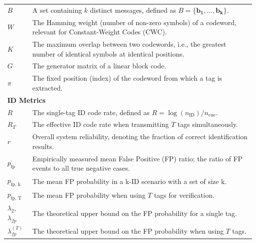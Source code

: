 \documentclass[english,BCOR=4mm,cdfont=false]{tudscrreprt} %
\begin{document}
\begin{longtable}{@{}p{} p{}@{}}
$B$                          & A set containing $k$ distinct messages, defined as $B = \{\boldsymbol{b_1}, \dots, \boldsymbol{b_k}\}$. \\
$W$                          & The Hamming weight (number of non-zero symbols) of a codeword, relevant for Constant-Weight Codes (CWC). \\
$K$                          & The maximum overlap between two codewords, i.e., the greatest number of identical symbols at identical positions. \\
$G$                          & The generator matrix of a linear block code. \\
$\pi$                        & The fixed position (index) of the codeword from which a tag is extracted. \\
\midrule

\multicolumn{2}{l}{\textbf{ID Metrics}} \\ \addlinespace
$R$                       & The single-tag ID code rate, defined as $R = \log(n_\text{ID}) / n_\text{cue}$. \\
$R_T$                     & The effective ID code rate when transmitting $T$ tags simultaneously. \\
$r$                       & Overall system reliability, denoting the fraction of correct identification results. \\
$\overline{p_\text{fp}}$  & Empirically measured mean False Positive (FP) ratio; the ratio of FP events to all true negative cases. \\
$p_\text{fp, k}$      & The mean FP probability in a k-ID scenario with a set of size k. \\
$p_\text{fp, T}$            & The mean FP probability when using $T$ tags for verification. \\
$\lambda_2$, $\lambda_{fp}$ & The theoretical upper bound on the FP probability for a single tag. \\
$\lambda_{fp}^{(T)}$            & The theoretical upper bound on the FP probability when using $T$ tags.  \\
\midrule


\end{longtable}
\end{document}
